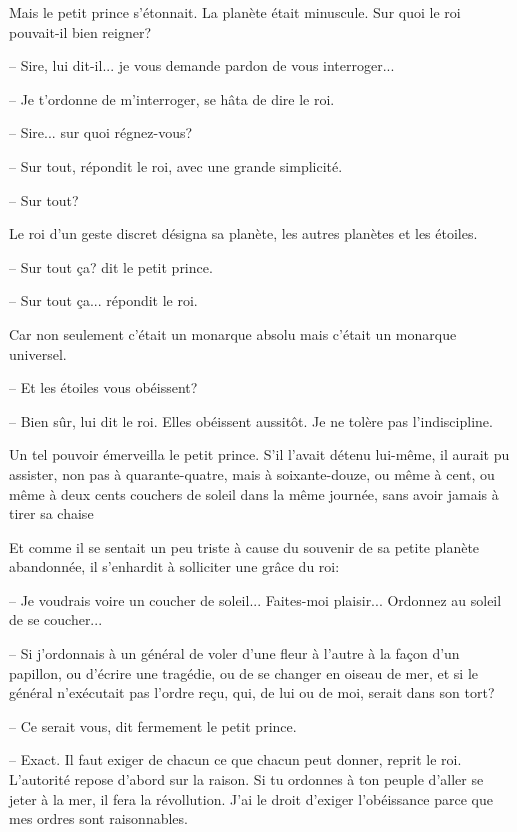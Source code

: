 \documentclass[a4paper]{report}
\begin{document}
Mais le petit prince s'étonnait. La planète était minuscule. Sur quoi le roi pouvait-il bien reigner?

-- Sire, lui dit-il... je vous demande pardon de vous interroger...

-- Je t'ordonne de m'interroger, se hâta de dire le roi.

-- Sire... sur quoi régnez-vous?

-- Sur tout, répondit le roi, avec une grande simplicité.

-- Sur tout?

Le roi d'un geste discret désigna sa planète, les autres planètes et les étoiles.

-- Sur tout ça? dit le petit prince.

-- Sur tout ça... répondit le roi.

Car non seulement c'était un monarque absolu mais c'était un monarque universel.

-- Et les étoiles vous obéissent?

-- Bien sûr, lui dit le roi. Elles obéissent aussitôt. Je ne tolère pas l'indiscipline.

Un tel pouvoir émerveilla le petit prince. S'il l'avait détenu lui-même, il aurait pu assister, non pas à quarante-quatre, mais à soixante-douze, ou même à cent, ou même à deux cents couchers de soleil dans la même journée, sans avoir jamais à tirer sa chaise

Et comme il se sentait un peu triste à cause du souvenir de sa petite planète abandonnée, il s'enhardit à solliciter une grâce du roi:

-- Je voudrais voire un coucher de soleil... Faites-moi plaisir... Ordonnez au soleil de se coucher...

-- Si j'ordonnais à un général de voler d'une fleur à l'autre à la façon d'un papillon, ou d'écrire une tragédie, ou de se changer en oiseau de mer, et si le général n'exécutait pas l'ordre reçu, qui, de lui ou de moi, serait dans son tort?

-- Ce serait vous, dit fermement le petit prince.

-- Exact. Il faut exiger de chacun ce que chacun peut donner, reprit le roi. L'autorité repose d'abord sur la raison. Si tu ordonnes à ton peuple d'aller se jeter à la mer, il fera la révollution. J'ai le droit d'exiger l'obéissance parce que mes ordres sont raisonnables.
\end{document}
